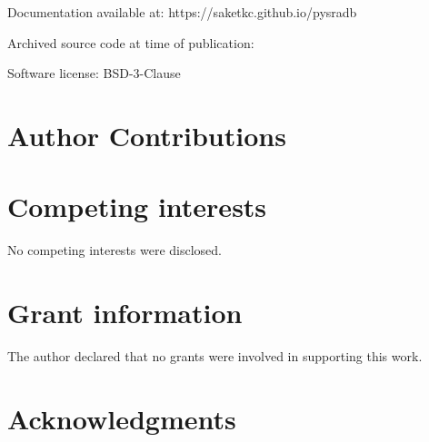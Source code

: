 \documentclass[9pt,a4paper]{extarticle}
\begin{document}
Documentation available at: https://saketkc.github.io/pysradb

Archived source code at time of publication: 

Software license: BSD-3-Clause

\section*{Author Contributions}

\section*{Competing interests}
No competing interests were disclosed.

\section*{Grant information}
The author declared that no grants were involved in supporting this work.

\section*{Acknowledgments}

\begin{comment}
This section should acknowledge anyone who contributed to the research or the
article but who does not qualify as an author based on the criteria provided earlier
(e.g. someone or an organization that provided writing assistance). Please state how
they contributed; authors should obtain permission to acknowledge from all those
mentioned in the Acknowledgments section.

Please do not list grant funding in this section.
\end{comment}

{\small
}
\end{document}
